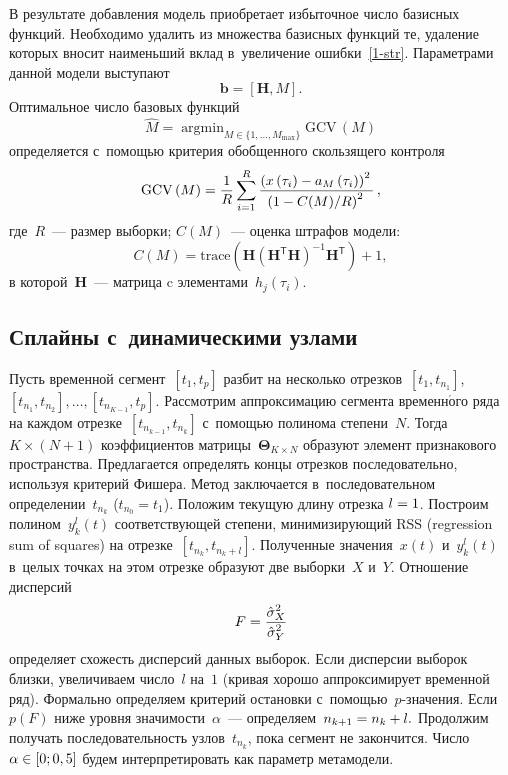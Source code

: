 \begin{multicols}{2}
В результате добавления  модель приобретает избыточное 
число базисных функций. Необходимо  удалить из множества базисных функций те, 
удаление которых  вносит наименьший вклад в~увеличение ошибки~\eqref{1-str}. 
Параметрами данной модели выступают
\begin{equation}
\label{6-str}
 \mathbf{b} = [\mathbf{H}, M].
\end{equation}
Оптимальное число базовых функций
$$
\hat{M}=\mathop{\mathop{\mathrm{arg}}\min}_{M \in \{1, \ldots, M_{\max}\}}\mathrm{GCV}\,(M)
$$
определяется с~помощью критерия обобщенного скользящего контроля
$$
\mathrm{GCV}\,(M)=\displaystyle\frac{\displaystyle 1\mathstrut}{\displaystyle R\mathstrut}\sum\limits_{i=1}^R
\displaystyle\frac{\displaystyle \left(x\left(\tau_i\right)-a_M\left(\tau_i\right)\right)^2\mathstrut}{\displaystyle 
\left(1-C(M)/R\right)^2\mathstrut}\,,
$$ 
где~$R$~--- размер выборки;  $C(M)$~--- оценка штрафов модели: 
$$C(M)=\mathrm{trace}\left(\mathbf{H}\left(\mathbf{H}^\mathsf{T}\mathbf{H}\right)^{-1}
\mathbf{H}^\mathsf{T}\right)+1,
$$
в которой~$\mathbf{H}$~--- матрица c элементами~$h_j(\tau_i)$.

\subsection{Сплайны с~динамическими узлами}

Пусть временной сегмент~$[t_1,t_p]$ разбит на несколько 
отрезков~$[t_1,t_{n_1}]$, $[t_{n_1},t_{n_2}],\ldots, [t_{n_{K-1}},t_p]$. 
Рассмотрим аппроксимацию сегмента временн$\acute{\mbox{о}}$го ряда на каждом
 отрезке~$[t_{n_{k-1}},t_{n_k}]$ с~помощью полинома степени~$N$. 
 Тогда~$K\times (N+1)$ коэффициентов матрицы~$\boldsymbol{\Theta}_{K \times N}$ 
 образуют элемент признакового пространства. Предлагается определять 
 концы отрезков последовательно, используя критерий Фишера. 
 Метод заключается в~последовательном определении~$t_{n_k}$ ($t_{n_0}=t_1$). 
 Положим текущую длину отрезка $l\hm=1$. Построим полином~$y_k^l(t)$ 
 соответствующей степени, минимизирующий RSS (regression sum of squares)
 на отрезке~$[t_{n_k},t_{n_{k}+l}]$. 
 Полученные значения~$x(t)$ и~$y_k^l(t)$ в~целых точках на этом отрезке 
 образуют две выборки~$X$ и~$Y$. Отношение дисперсий
 $$
 F=\displaystyle\frac{\displaystyle \hat\sigma^2_X\mathstrut}{\displaystyle \hat\sigma^2_Y\mathstrut}
 $$
определяет схожесть дисперсий данных выборок. 
Если дисперсии выборок близки, увеличиваем чис\-ло~$l$ на~$1$ 
(кривая хорошо аппроксимирует временной ряд). Формально определяем 
критерий остановки с~помощью~$p$-зна\-че\-ния.
Если~$p(F)$ ниже уровня значимости~$\alpha$~--- 
определяем~$n_{k+1}\hm=n_k\hm+l.$ Продолжим получать последовательность 
узлов~$t_{n_k}$, пока сегмент не закончится. 
Число~$\alpha\hm\in[0;0,5]$ будем интерпретировать как параметр метамодели.


\end{multicols}
